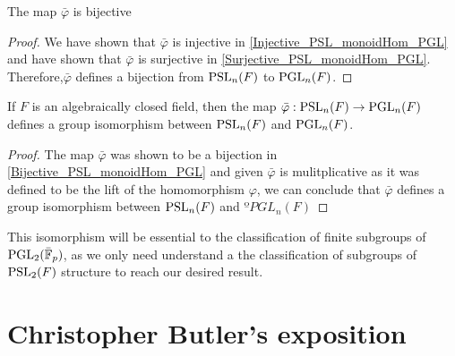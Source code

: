 \begin{lemma}
\label{Bijective_PSL_monoidHom_PGL}
\leanok
    The map $\bar{\varphi}$ is bijective
\end{lemma}

\begin{proof}
 We have shown that $\bar{\varphi}$ is injective in \ref{Injective_PSL_monoidHom_PGL} and have shown that $\bar{\varphi}$ is surjective in \ref{Surjective_PSL_monoidHom_PGL}. 
 Therefore,$\bar{\varphi}$ defines a bijection from $\operatorname{PSL}_n(F)$ to $\operatorname{PGL}_n(F)$.
\end{proof}

\begin{theorem}
\label{PGL_iso_PSL}
\leanok
    If $F$ is an algebraically closed field, then the map $\bar{\varphi} : \operatorname{PSL}_n(F) \rightarrow \operatorname{PGL}_n(F)$ defines a group isomorphism between $\operatorname{PSL}_n(F)$ and $\operatorname{PGL}_n(F)$.
\end{theorem}

\begin{proof}
    The map $\bar{\varphi}$ was shown to be a bijection in \ref{Bijective_PSL_monoidHom_PGL} and given $\bar{\varphi}$ is mulitplicative as it was defined to be the lift of the homomorphism $\varphi$, we can conclude that 
    $\bar{\varphi}$ defines a group isomorphism between $\operatorname{PSL}_n(F)$ and $ºPGL_n(F)$
\end{proof}




This isomorphism will be essential to the classification of finite subgroups of $\operatorname{PGL}_2(\bar{\mathbb{F}}_p)$, as we only need understand a the classification of subgroups of $\operatorname{PSL}_2(F)$ structure to reach our desired result.


\section{Christopher Butler's exposition}

